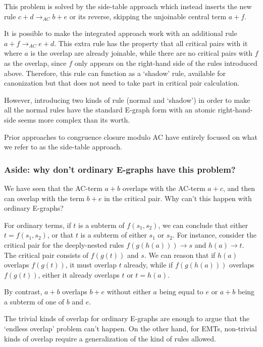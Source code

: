 \documentclass[12pt,a4paper,twoside,openright]{report}
\numberwithin{equation}{chapter}		%
\numberwithin{figure}{chapter}			%
\numberwithin{table}{chapter}			%
\theoremstyle{definition}
\theoremstyle{plain}
\begin{document}
This problem is solved by the side-table approach which instead inserts the new rule $c + d  \rightarrow_{AC} b + e$ or its reverse, skipping the unjoinable central term $a + f$.

It is possible to make the integrated approach work with an additional rule $a + f \rightarrow_{AC} e + d$. This extra rule has the property that all critical pairs with it where $a$ is the overlap are already joinable, while there are no critical pairs with $f$ as the overlap, since $f$ only appears on the right-hand side of the rules introduced above. Therefore, this rule can function as a `shadow' rule, available for canonization but that does not need to take part in critical pair calculation.

However, introducing two kinds of rule (normal and `shadow') in order to make all the normal rules have the standard E-graph form with an atomic right-hand-side seems more complex than its worth.

Prior approaches to congruence closure modulo AC \cite{bachmair_abstract_2000, tiwari_decision_2000, kapur_modular_2021} have entirely focused on what we refer to as the side-table approach.

\subsubsection{Aside: why don't ordinary E-graphs have this problem?}
We have seen that the AC-term $a + b$ overlaps with the AC-term $a + c$, and then can overlap with the term $b + e$ in the critical pair. Why can't this happen with ordinary E-graphs?

For ordinary terms, if $t$ is a subterm of $f(s_1, s_2)$, we can conclude that either $t = f(s_1, s_2)$, or that $t$ is a subterm of either $s_1$ or $s_2$. For instance, consider the critical pair for the deeply-nested rules $f(g(h(a))) \rightarrow s$ and $h(a) \rightarrow t$. The critical pair consists of $f(g(t))$ and $s$. We can reason that if $h(a)$ overlaps $f(g(t))$, it must overlap $t$ already, while if $f(g(h(a)))$ overlaps $f(g(t))$, either it already overlaps $t$ or $t = h(a)$.

By contrast, $a + b$ overlaps $b + e$ without either $a$ being equal to $e$ or $a + b$ being a subterm of one of $b$ and $e$.

The trivial kinds of overlap for ordinary E-graphs are enough to argue that the `endless overlap' problem can't happen. On the other hand, for EMTs, non-trivial kinds of overlap require a generalization of the kind of rules allowed.
\end{document}
